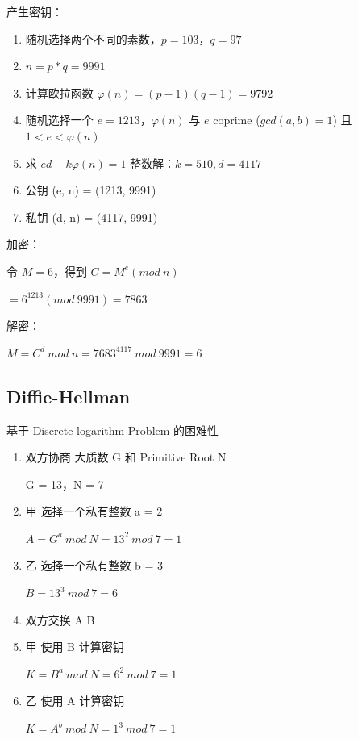 \documentclass[11pt,journal,compsoc]{IEEEtran}
\begin{document}
产生密钥：

\begin{enumerate}
    \item 随机选择两个不同的素数，$p = 103$，$q = 97$

    \item $n = p * q = 9991$

    \item 计算欧拉函数 $\varphi(n) = (p - 1)(q - 1) = 9792$

    \item 随机选择一个 $e = 1213$，$\varphi(n)$ 与 $e$ coprime ($gcd(a, b) = 1$) 且 $1 < e < \varphi(n)$

    \item 求 $ed - k\varphi(n) = 1$ 整数解：$k = 510, d = 4117$

    \item 公钥 (e, n) = (1213, 9991)
    
    \item 私钥 (d, n) = (4117, 9991)
\end{enumerate}

加密：

令 $M = 6$，得到 $C = M^e (mod ~n)$

$= 6^{1213} (mod ~9991) = 7863$

解密：

$M = C^d ~mod ~n = 7683^{4117} ~mod ~9991 = 6$


\subsection{Diffie-Hellman}

基于 Discrete logarithm Problem 的困难性

\begin{enumerate}
    \item 双方协商 大质数 G 和 Primitive Root N

    G = 13，N = 7

    \item 甲 选择一个私有整数 a = 2

    $A = G^a ~mod ~N = 13^2 ~mod ~7 = 1$

    \item 乙 选择一个私有整数 b = 3

    $B = 13^3 ~mod ~7 = 6$

    \item 双方交换 A B

    \item 甲 使用 B 计算密钥

    $K = B^a ~mod ~N = 6^2 ~mod ~7 = 1$

    \item 乙 使用 A 计算密钥

    $K = A^b ~mod ~N = 1^3 ~mod ~7 = 1$
\end{enumerate}
\end{document}
